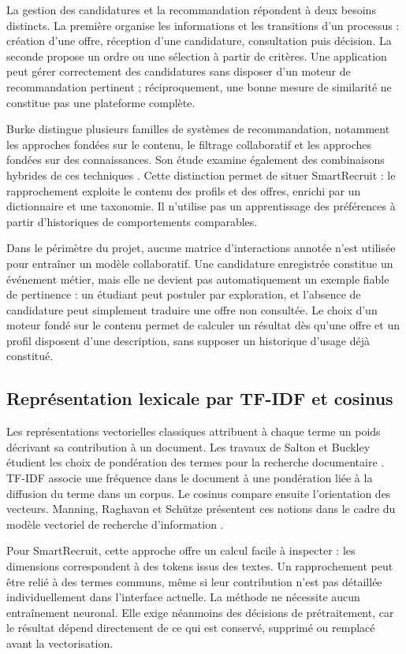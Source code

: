 La gestion des candidatures et la recommandation répondent à deux besoins distincts. La première organise les informations et les transitions d'un processus : création d'une offre, réception d'une candidature, consultation puis décision. La seconde propose un ordre ou une sélection à partir de critères. Une application peut gérer correctement des candidatures sans disposer d'un moteur de recommandation pertinent ; réciproquement, une bonne mesure de similarité ne constitue pas une plateforme complète.

Burke distingue plusieurs familles de systèmes de recommandation, notamment les approches fondées sur le contenu, le filtrage collaboratif et les approches fondées sur des connaissances. Son étude examine également des combinaisons hybrides de ces techniques \cite{burke2002}. Cette distinction permet de situer SmartRecruit : le rapprochement exploite le contenu des profils et des offres, enrichi par un dictionnaire et une taxonomie. Il n'utilise pas un apprentissage des préférences à partir d'historiques de comportements comparables.

Dans le périmètre du projet, aucune matrice d'interactions annotée n'est utilisée pour entraîner un modèle collaboratif. Une candidature enregistrée constitue un événement métier, mais elle ne devient pas automatiquement un exemple fiable de pertinence : un étudiant peut postuler par exploration, et l'absence de candidature peut simplement traduire une offre non consultée. Le choix d'un moteur fondé sur le contenu permet de calculer un résultat dès qu'une offre et un profil disposent d'une description, sans supposer un historique d'usage déjà constitué.

\subsection{Représentation lexicale par TF-IDF et cosinus}

Les représentations vectorielles classiques attribuent à chaque terme un poids décrivant sa contribution à un document. Les travaux de Salton et Buckley étudient les choix de pondération des termes pour la recherche documentaire \cite{salton1988}. TF-IDF associe une fréquence dans le document à une pondération liée à la diffusion du terme dans un corpus. Le cosinus compare ensuite l'orientation des vecteurs. Manning, Raghavan et Schütze présentent ces notions dans le cadre du modèle vectoriel de recherche d'information \cite{manning2008}.

Pour SmartRecruit, cette approche offre un calcul facile à inspecter : les dimensions correspondent à des tokens issus des textes. Un rapprochement peut être relié à des termes communs, même si leur contribution n'est pas détaillée individuellement dans l'interface actuelle. La méthode ne nécessite aucun entraînement neuronal. Elle exige néanmoins des décisions de prétraitement, car le résultat dépend directement de ce qui est conservé, supprimé ou remplacé avant la vectorisation.

